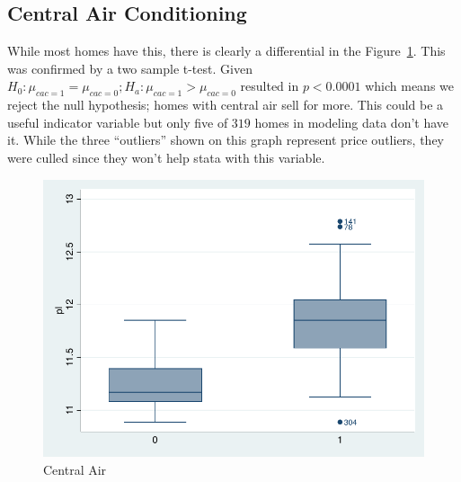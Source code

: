 \documentclass[twocolumn,11pt]{article}
\begin{document}

\subsection*{Central Air Conditioning}
While most homes have this, there is clearly a differential in the Figure~\ref{fig:cac-box}.
This was confirmed by a two sample t-test.
Given $H_0: \mu_{cac=1} = \mu_{cac=0}; H_a: \mu_{cac=1} > \mu_{cac=0}$ resulted
in $p < 0.0001 $ which means we reject the null hypothesis; homes with central air sell for more.
This could be a useful indicator variable but only five of $319$ homes in modeling data don't have it.
While the three ``outliers'' shown on this graph represent price outliers,
they were culled since they won't help stata with this variable.
\begin{figure}[H]
\centering
  \includegraphics[width=.9\linewidth]{figures/cac-box.pdf}
  \caption{Central Air}
  \label{fig:cac-box}
\end{figure}

\end{document}
